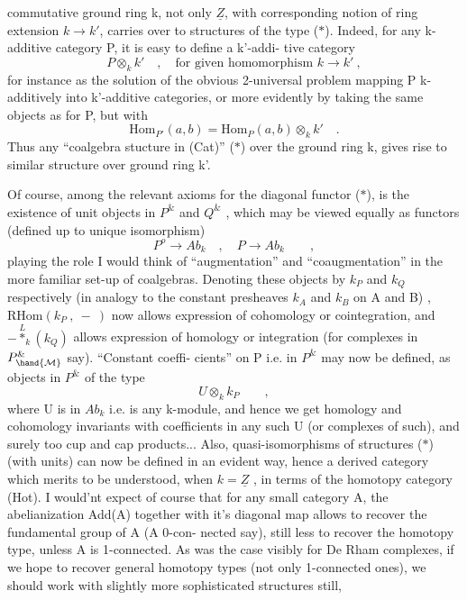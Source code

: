 
commutative ground ring k,  not only $\underline{Z}$,  with corresponding notion of
ring extension $k\to k'$,  carries over to structures of the type ($\ast$).
Indeed,  for any k-additive category P,  it is easy to define a k'-addi-%
tive category
\[ P\otimes_k k' \quad ,\quad \text{for given homomorphism } k\to k' \ , \]
for instance as the solution of the obvious 2-universal problem  
mapping P k-additively into k'-additive categories, or more evidently
by taking the same objects as for P,  but with
\[ \mathrm{Hom}_{P'}(a,b) = \mathrm{Hom}_{P}(a,b)\otimes_k k' \quad . \]
Thus any ``coalgebra stucture in (Cat)'' ($\ast$) over the ground ring k,  
gives rise to similar structure over ground ring k'.

Of course,  among the relevant axioms for the diagonal functor ($\ast$),
is the existence of unit objects in $P^{\&}$ and $Q^{\&}$ ,  which may be viewed
equally as  functors (defined up to unique isomorphism)
\[ P^{o}\to Ab_k \quad , \quad P\to Ab_k \qquad , \]
playing the role I would think of ``augmentation'' and ``coaugmentation''
in the more familiar set-up of  coalgebras.  Denoting these objects by
$k_P$  and $k_Q$  respectively (in analogy to the constant presheaves $k_A$  and
$k_B$ on A and B) ,   $\mathrm{RHom}(k_P\ ,\ -\ )$  now allows expression of
cohomology or cointegration,  and  $-\overset{L}{\ast}_k(k_Q)$  allows expression of
homology or integration (for complexes in $P^{\&}_{\hand{\mathcal{M}}}$ say).  ``Constant coeffi-%
cients''  on P i.e. in $P^{\&}$ may now be defined,  as objects in $P^{\&}$ of the
type
\[ U\otimes_k k_P \qquad , \]
where U is in $Ab_k$  i.e. is any k-module,  and hence we get homology and
cohomology invariants with coefficients in any such U (or complexes of
such),  and surely too cup and cap products... Also,  quasi-isomorphisms
of structures ($\ast$)  (with units)  can now be defined in an evident way,
hence a derived category which merits to be understood,  when $k=\underline{Z}$ , in
terms of the homotopy category (Hot).  I would'nt expect of course
that for any small category A,  the abelianization Add(A) together with
it's diagonal map allows to recover the fundamental group of A (A 0-con-%
nected say),  still less to recover the homotopy type, unless A is
1-connected.  As was the case visibly for De Rham complexes,  if we
hope to recover general homotopy types (not only 1-connected ones), we
should  work with slightly more sophisticated structures still,

